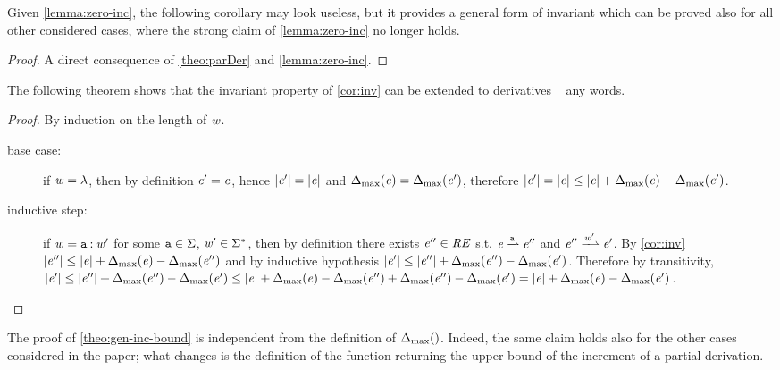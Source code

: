 Given \cref{lemma:zero-inc}, the following corollary may look useless,
but it provides a general form of invariant which can be proved also for all other considered cases, where the strong claim of \cref{lemma:zero-inc} no longer holds.

\begin{proof}
 A direct consequence of \cref{theo:parDer} and \cref{lemma:zero-inc}.
\end{proof}

The following theorem shows that the invariant property of \cref{cor:inv} can be extended to derivatives \wrt~ any words.
\begin{proof}
 By induction on the length of $\mathit {w}$.
 \begin{description}
  \item[base case:] if $\mathit {w}=\lambda$, then by definition $\mathit {e}'=\mathit {e}$, hence
   ${\mid}{\mathit {e}'}{\mid}={\mid}{\mathit {e}}{\mid}$ and ${\Delta_{\max}}({\mathit {e}})={\Delta_{\max}}({\mathit {e}'})$, therefore ${\mid}{\mathit {e}'}{\mid}={\mid}{\mathit {e}}{\mid}\leq{\mid}{\ensuremath{\mathit {e}}}{\mid}+{\Delta_{\max}}({\mathit {e}})-{\Delta_{\max}}({\mathit {e}'})$.

  \item[inductive step:]
   if $\mathit {w}=\mathtt {a}\mathbin{:}\mathit {w}'$ for some $\mathtt {a}\in\Sigma$, $\mathit {w}'\in\Sigma^*$, then by definition there exists $\mathit {e}''\in\mathit {RE}$ s.t. $\re\parDer{\sym}\re''$ and $\re''\parDer{\word'}\re'$. By \cref{cor:inv} ${\mid}{\mathit {e}''}{\mid}\leq{\mid}{\ensuremath{\mathit {e}}}{\mid}+{\Delta_{\max}}({\mathit {e}})-{\Delta_{\max}}({\mathit {e}''})$ and by inductive hypothesis ${\mid}{\mathit {e}'}{\mid}\leq{\mid}{\ensuremath{\mathit {e}}''}{\mid}+{\Delta_{\max}}({\mathit {e}''})-{\Delta_{\max}}({\mathit {e}'})$. Therefore by transitivity,
   ${\mid}{\mathit {e}'}{\mid}\leq{\mid}{\ensuremath{\mathit {e}}''}{\mid}+{\Delta_{\max}}({\mathit {e}''})-{\Delta_{\max}}({\mathit {e}'})\leq{\mid}{\ensuremath{\mathit {e}}}{\mid}+{\Delta_{\max}}({\mathit {e}})-{\Delta_{\max}}({\mathit {e}''})+{\Delta_{\max}}({\mathit {e}''})-{\Delta_{\max}}({\mathit {e}'})={\mid}{\mathit {e}}{\mid}+{\Delta_{\max}}({\mathit {e}})-{\Delta_{\max}}({\mathit {e}'})$.
 \end{description}
\end{proof}

The proof of \cref{theo:gen-inc-bound} is independent from the definition of ${\Delta_{\max}}({})$. Indeed, the same claim holds also for the other cases considered in the paper; what changes is the definition of the function returning the upper bound of the increment of a partial derivation.

